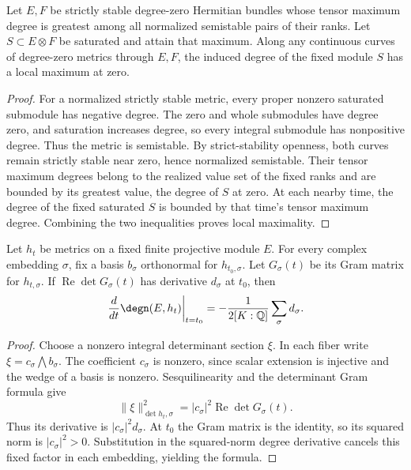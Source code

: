 \begin{lemma}
\label{lem:extremal-degree-local-maximum}
\leanok
Let $E,F$ be strictly stable degree-zero Hermitian bundles whose tensor
maximum degree is greatest among all normalized semistable pairs of their
ranks. Let $S\subset E\otimes F$ be saturated and attain that maximum.
Along any continuous curves of degree-zero metrics through $E,F$, the
induced degree of the fixed module $S$ has a local maximum at zero.
\end{lemma}
\begin{proof}
For a normalized strictly stable metric, every proper nonzero saturated
submodule has negative degree. The zero and whole submodules have degree
zero, and saturation increases degree, so every integral submodule has
nonpositive degree. Thus the metric is semistable.
By strict-stability openness, both curves remain strictly stable near
zero, hence normalized semistable. Their tensor maximum degrees belong
to the realized value set of the fixed ranks and are bounded by its
greatest value, the degree of $S$ at zero. At each nearby time, the
degree of the fixed saturated $S$ is bounded by that time's tensor
maximum degree. Combining the two inequalities proves local maximality.
\end{proof}

\begin{lemma}
\label{lem:arithmetic-gram-derivative}
\leanok
Let $h_t$ be metrics on a fixed finite projective module $E$. For every
complex embedding $\sigma$, fix a basis $b_\sigma$ orthonormal for
$h_{t_0,\sigma}$. Let $G_\sigma(t)$ be its Gram matrix for $h_{t,\sigma}$.
If $\operatorname{Re}\det G_\sigma(t)$ has derivative $d_\sigma$ at $t_0$,
then
\[
 \left.\frac{d}{dt}\degn(E,h_t)\right|_{t=t_0}
 =-\frac1{2[K:\mathbb Q]}\sum_\sigma d_\sigma.
\]
\end{lemma}
\begin{proof}
Choose a nonzero integral determinant section $\xi$. In each fiber write
$\xi=c_\sigma\bigwedge b_\sigma$. The coefficient $c_\sigma$ is nonzero,
since scalar extension is injective and the wedge of a basis is nonzero.
Sesquilinearity and the determinant Gram formula give
\[
 \|\xi\|_{\det h_t,\sigma}^2
 =|c_\sigma|^2\operatorname{Re}\det G_\sigma(t).
\]
Thus its derivative is $|c_\sigma|^2d_\sigma$. At $t_0$ the Gram matrix
is the identity, so its squared norm is $|c_\sigma|^2>0$.
Substitution in the squared-norm degree derivative cancels this fixed
factor in each embedding, yielding the formula.
\end{proof}

